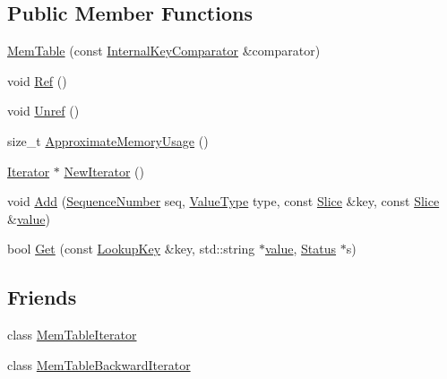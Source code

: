 \subsection*{Public Member Functions}
\begin{DoxyCompactItemize}
\item 
\mbox{\hyperlink{classleveldb_1_1_mem_table_a23add92a4a6e5d1521f3b6695dba5c2d}{Mem\+Table}} (const \mbox{\hyperlink{classleveldb_1_1_internal_key_comparator}{Internal\+Key\+Comparator}} \&comparator)
\item 
void \mbox{\hyperlink{classleveldb_1_1_mem_table_a332484cffd2ebc7d6a51f22eeeeeb71b}{Ref}} ()
\item 
void \mbox{\hyperlink{classleveldb_1_1_mem_table_a5dcbf17d1477e6098a30dadd0745cfb2}{Unref}} ()
\item 
size\+\_\+t \mbox{\hyperlink{classleveldb_1_1_mem_table_a667a1ada274201f0bdd3615baf1bd882}{Approximate\+Memory\+Usage}} ()
\item 
\mbox{\hyperlink{classleveldb_1_1_iterator}{Iterator}} $\ast$ \mbox{\hyperlink{classleveldb_1_1_mem_table_a396b8ba5e2ea0de25b666026f3b9235f}{New\+Iterator}} ()
\item 
void \mbox{\hyperlink{classleveldb_1_1_mem_table_a37bec80954badb2354426aa175e9371f}{Add}} (\mbox{\hyperlink{namespaceleveldb_a5481ededd221c36d652c371249f869fa}{Sequence\+Number}} seq, \mbox{\hyperlink{namespaceleveldb_acc038cb0d608414730cafa459a4ba866}{Value\+Type}} type, const \mbox{\hyperlink{classleveldb_1_1_slice}{Slice}} \&key, const \mbox{\hyperlink{classleveldb_1_1_slice}{Slice}} \&\mbox{\hyperlink{version__set_8cc_a38c8b88c432e666ad10b0c5573e1160a}{value}})
\item 
bool \mbox{\hyperlink{classleveldb_1_1_mem_table_af94f80a5909a440d0675afa68f8765c5}{Get}} (const \mbox{\hyperlink{classleveldb_1_1_lookup_key}{Lookup\+Key}} \&key, std\+::string $\ast$\mbox{\hyperlink{version__set_8cc_a38c8b88c432e666ad10b0c5573e1160a}{value}}, \mbox{\hyperlink{classleveldb_1_1_status}{Status}} $\ast$s)
\end{DoxyCompactItemize}
\subsection*{Friends}
\begin{DoxyCompactItemize}
\item 
class \mbox{\hyperlink{classleveldb_1_1_mem_table_ad6cb602bccb9af617c8cb348ae693d4a}{Mem\+Table\+Iterator}}
\item 
class \mbox{\hyperlink{classleveldb_1_1_mem_table_ab6427243fb396d56604898725f9f2327}{Mem\+Table\+Backward\+Iterator}}
\end{DoxyCompactItemize}


